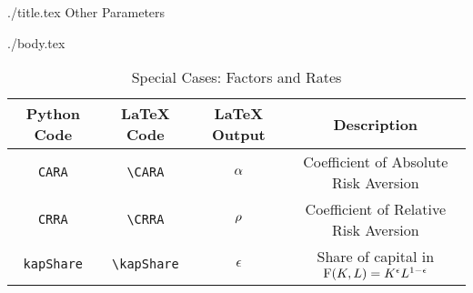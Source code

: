 \documentclass[12pt]{econtex}
\begin{document}
\begin{verbatimwrite}{./title.tex}
Other Parameters
\end{verbatimwrite}

\title{}

\date{\today}
\maketitle 

\begin{verbatimwrite}{./body.tex}

\renewcommand{\kapShare}{\ensuremath{\epsilon}}

\begin{table}[h]
	\centering
	\begin{tabular}{||>{\ttfamily}cccc||} 		
		\hline
		 Python Code & LaTeX Code & LaTeX Output & Description 
\\ \hline
   \texttt{CARA} & \verb|\CARA|    & $\alpha$    & Coefficient of Absolute Risk Aversion%
\\ \texttt{CRRA} & \verb|\CRRA|    & $\rho$    & Coefficient of Relative Risk Aversion%
\\ \texttt{kapShare} & \verb|\kapShare|    & $\kapShare$    & Share of capital in $\FFunc(\Kap,\Labor)=\Kap^{\kapShare}\Labor^{1-\kapShare}$
\\	\hline
	\end{tabular}
	\caption{Special Cases: Factors and Rates}
	\label{table:SpecialFactors}
\end{table}	


\end{verbatimwrite}

\end{document}
